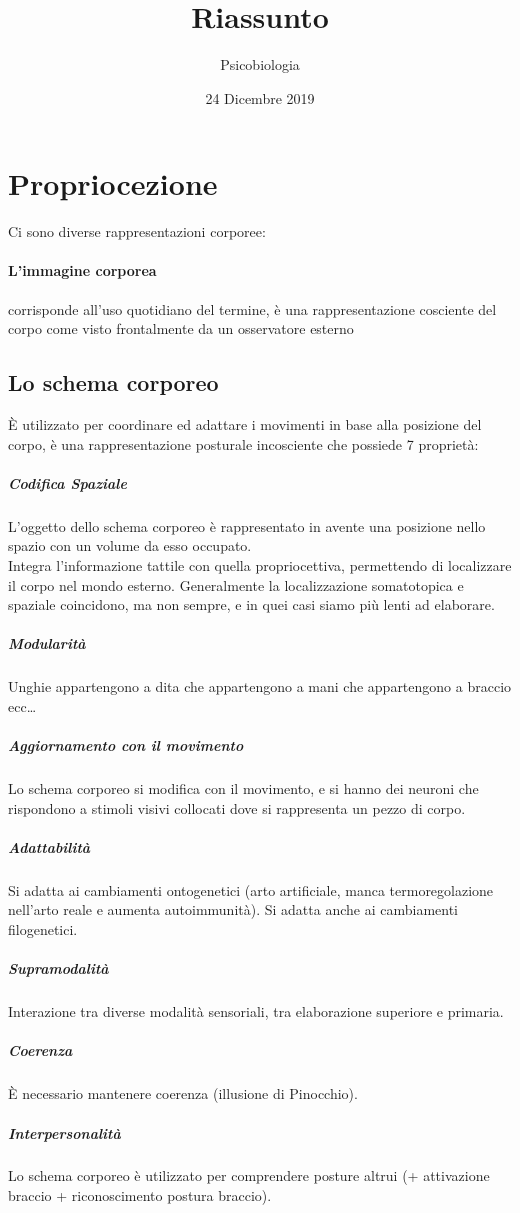 \documentclass[12pt, a4paper]{article}
\date{24 Dicembre 2019}
\title{Riassunto}
\author{Psicobiologia}
\begin{document}
\maketitle

\newpage

\tableofcontents

\newpage

\section{Propriocezione}

Ci sono diverse rappresentazioni corporee: 

\paragraph{L'immagine corporea}  corrisponde all'uso quotidiano del termine, è una rappresentazione cosciente del corpo come visto frontalmente da un osservatore esterno

\subsection{Lo schema corporeo}  
È utilizzato per coordinare ed adattare i movimenti in base alla posizione del corpo, è una rappresentazione posturale incosciente che possiede 7 proprietà:

\subparagraph{Codifica Spaziale} 

L'oggetto dello schema corporeo è rappresentato in avente una posizione nello spazio con un volume da esso occupato.
\medskip\\ 
Integra l'informazione tattile con quella propriocettiva, permettendo di localizzare il corpo nel mondo esterno. Generalmente la localizzazione somatotopica e spaziale coincidono, ma non sempre, e in quei casi siamo più lenti ad elaborare.

\subparagraph{Modularità} Unghie appartengono a dita che appartengono a mani che appartengono a braccio ecc\ldots

\subparagraph{Aggiornamento con il movimento} Lo schema corporeo si modifica con il movimento, e si hanno dei neuroni che rispondono a stimoli visivi collocati dove si rappresenta un pezzo di corpo.

\subparagraph{Adattabilità} Si adatta ai cambiamenti ontogenetici (arto artificiale, manca termoregolazione nell'arto reale e aumenta autoimmunità). Si adatta anche ai cambiamenti filogenetici.
\subparagraph{Supramodalità} Interazione tra diverse modalità sensoriali, tra elaborazione superiore e primaria.
\subparagraph{Coerenza} È necessario mantenere coerenza (illusione di Pinocchio).
\subparagraph{Interpersonalità} Lo schema corporeo è utilizzato per comprendere posture altrui (+ attivazione braccio + riconoscimento postura braccio).
\end{document}
